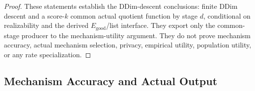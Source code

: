 \begin{proof}
These statements establish the DDim-descent conclusions: finite DDim
descent and a score-\(k\) common actual quotient function by stage \(d\),
conditional on realizability and the derived \(E_{\mathrm{good}}\)/list
interface. They export only the common-stage producer to the
mechanism-utility argument. They do
not prove mechanism accuracy, actual mechanism selection, privacy,
empirical utility, population utility, or any rate specialization.



\end{proof}

\subsection{Mechanism Accuracy and Actual Output}\label{app:step_010}


